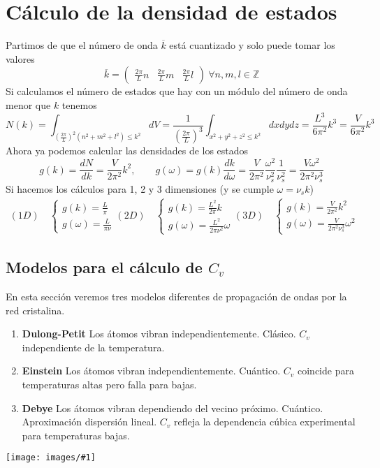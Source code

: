 \documentclass[leqno]{article}
\newcommand{\incimg}[1]{%
\center
\texttt{[image: images/\#1]}
}
\begin{document}
\section{Cálculo de la densidad de estados}
Partimos de que el número de onda $\overline{k}$ está cuantizado y solo puede tomar los valores
\[
  \overline{k} = \begin{pmatrix} \frac{2\pi}{L}n & \frac{2\pi}{L}m & \frac{2\pi}{L}l \end{pmatrix} \ \forall n, m, l \in \mathbb{Z}
\] 
Si calculamos el número de estados que hay con un módulo del número de onda menor que  $k$ tenemos
 \[
N(k) = \int_{(\frac{2\pi}{L})^2(n^2 + m^2+l^2)\le k^2} dV = \frac{1}{\left( \frac{2\pi}{L} \right)^3 } \int_{x^2+y^2+z^2\le k^2}dxdydz = \frac{L^3}{6\pi^2}k^3 = \frac{V}{6\pi^2}k^3
\] 
Ahora ya podemos calcular las densidades de los estados
\[
g(k) = \frac{dN}{dk} = \frac{V}{2\pi^2} k^2 , \qquad g(\omega ) = g(k) \frac{dk}{d\omega } = \frac{V}{2\pi^2} \frac{\omega^2 }{\nu_s^2}\frac{1}{\nu^2_s} = \frac{V \omega ^2}{2\pi^2 \nu_s^3}
\] 
Si hacemos los cálculos para 1, 2 y 3 dimensiones (y se cumple $\omega = \nu_s k$)
\begin{align*}
  (1D) \quad  
  \begin{cases}
    g(k) = \frac{L}{\pi} \\  g(\omega ) = \frac{L}{\pi \nu} 
  \end{cases}
  (2D) \quad  
  \begin{cases}
    g(k) = \frac{L^2}{2\pi}k \\  g(\omega ) = \frac{L^2}{2\pi \nu^2}\omega 
  \end{cases}
  (3D) \quad  
  \begin{cases}
    g(k) = \frac{V}{2\pi^2}k^2 \\  g(\omega ) = \frac{V}{2\pi^2 \nu_s^3}\omega ^2
  \end{cases}
\end{align*}

\subsection{Modelos para el cálculo de $C_v$}
En esta sección veremos tres modelos diferentes de propagación de ondas por la red cristalina.

\begin{minipage}{0.6\textwidth}
\begin{enumerate}[topsep=-6pt, itemsep=0pt]
  \item \textbf{Dulong-Petit} Los átomos vibran independientemente. Clásico. $C_v$ independiente de la temperatura.
  \item \textbf{Einstein} Los átomos vibran independientemente. Cuántico. $C_v$ coincide para temperaturas altas pero falla para bajas.
  \item \textbf{Debye} Los átomos vibran dependiendo del vecino próximo. Cuántico. Aproximación dispersión lineal. $C_v$ refleja la dependencia cúbica experimental para temperaturas bajas.
\end{enumerate}
\end{minipage}
\begin{minipage}{0.4\textwidth}
\incimg{comparisoncv.jpg}
\end{minipage}
\end{document}
